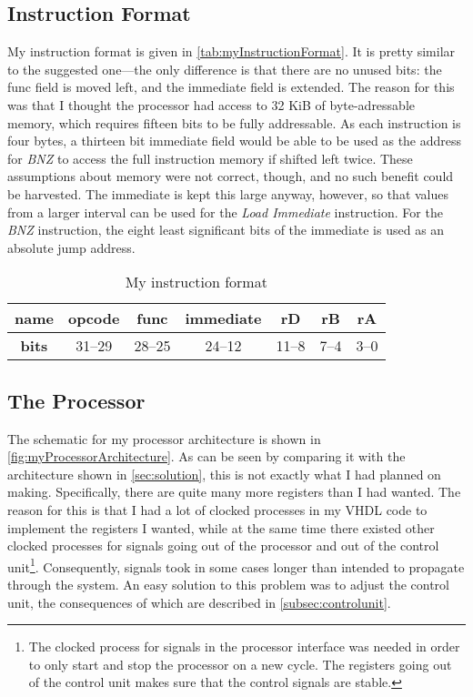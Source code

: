 \documentclass[11pt]{article}
\begin{document}
\subsection{Instruction Format}
\label{subsec:instructionFormat}
My instruction format is given in
\autoref{tab:myInstructionFormat}. It is pretty similar to the
suggested one---the only difference is that there are no unused bits:
the func field is moved left, and the immediate field is extended. The
reason for this was that I thought the processor had access to 32 KiB
of byte-adressable memory, which requires fifteen bits to be fully
addressable. As each instruction is four bytes, a thirteen bit
immediate field would be able to be used as the address for {\em BNZ}
to access the full instruction memory if shifted left twice. These
assumptions about memory were not correct, though, and no such benefit
could be harvested. The immediate is kept this large anyway, however,
so that values from a larger interval can be used for the {\em Load
  Immediate} instruction. For the {\em BNZ} instruction, the eight
least significant bits of the immediate is used as an absolute jump
address.

\begin{table}[htbp]
  \centering
  \begin{tabular}{|c|c|c|c|c|c|c|}
    \hline
    {\bf name} & opcode & func & immediate & rD & rB & rA \\ \hline
    {\bf bits} & 31--29 & 28--25 & 24--12 & 11--8 & 7--4 & 3--0 \\ \hline
  \end{tabular}
  \caption{My instruction format}
  \label{tab:myInstructionFormat}
\end{table}

\subsection{The Processor}
\label{subsec:processor}
The schematic for my processor architecture is shown in
\autoref{fig:myProcessorArchitecture}. As can be seen by comparing it
with the architecture shown in \autoref{sec:solution}, this is not
exactly what I had planned on making. Specifically, there are quite
many more registers than I had wanted. The reason for this is that I
had a lot of clocked processes in my VHDL code to implement the
registers I wanted, while at the same time there existed other clocked
processes for signals going out of the processor and out of the
control unit\footnote{The clocked process for signals in the processor
  interface was needed in order to only start and stop the processor
  on a new cycle. The registers going out of the control unit makes
  sure that the control signals are stable.}. Consequently, signals
took in some cases longer than intended to propagate through the
system. An easy solution to this problem was to adjust the control
unit, the consequences of which are described in
\autoref{subsec:controlunit}.
\end{document}
